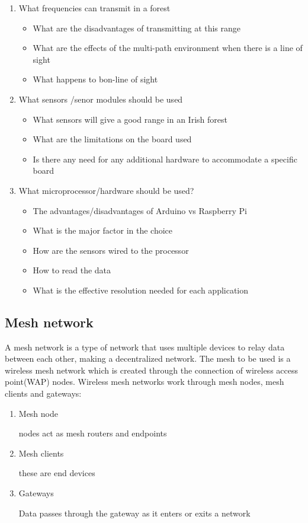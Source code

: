 		\begin{enumerate}
			\item What frequencies can transmit in a forest
			\begin{itemize}
				\item What are the disadvantages of transmitting at this range
				\item What are the effects of the multi-path environment when there is a line of sight
				\item What happens to bon-line of sight
			\end{itemize}
			\item What sensors /senor modules should be used
			\begin{itemize}
				\item What sensors will give a good range in an Irish forest
				\item What are the limitations on the board used
				\item Is there any need for any additional hardware to  accommodate a specific board 
			\end{itemize}
			\item What microprocessor/hardware should be used?
			\begin{itemize}
				\item The advantages/disadvantages of  Arduino vs Raspberry Pi
				\item What is the major factor in the choice 
				\item How are the sensors wired to the processor 
				\item How to read the  data
				\item What is the effective resolution needed for each application
			\end{itemize}
			
		\end{enumerate}
	\subsection{Mesh network}
	A mesh network is a type of network that uses multiple devices to relay data between each other, making a decentralized network.
	The mesh to be used is a wireless mesh network which is created through the connection of wireless access point(WAP) nodes.
	Wireless mesh networks work through mesh nodes, mesh clients and gateways:
	\begin{enumerate}
		\item Mesh node

		nodes act as mesh routers and endpoints
		\item Mesh clients

		these are  end devices
		\item Gateways

		Data passes through the gateway as it enters or exits a network
	\end{enumerate}


